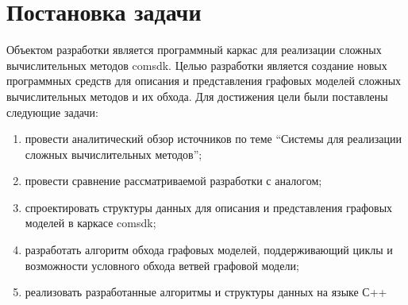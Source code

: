 \chapter{Постановка задачи}\label{chap1_taskStatement}
Объектом разработки является программный каркас для реализации сложных вычислительных методов comsdk. Целью разработки является создание новых программных средств для описания и представления графовых моделей сложных вычислительных методов и их обхода. Для достижения цели были поставлены следующие задачи:
\begin{enumerate}[1)]
    \item провести аналитический обзор источников по теме ``Системы для реализации сложных вычислительных методов'';
    \item провести сравнение рассматриваемой разработки с аналогом;
    \item спроектировать структуры данных для описания и представления графовых моделей в каркасе comsdk;
    \item разработать алгоритм обхода графовых моделей, поддерживающий циклы и возможности условного обхода ветвей графовой модели;
    \item реализовать разработанные алгоритмы и структуры данных на языке С++
\end{enumerate}



